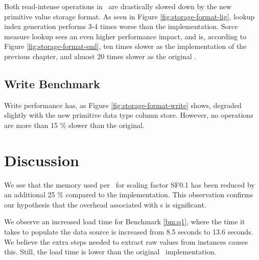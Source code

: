 
Both read-intense operations in \tpchdl~are drastically slowed down by the new primitive value storage format. As seen in Figure \ref{fig:storage-format-lig}, lookup index generation performs 3-4 times worse than the  implementation. Sorce measure lookup sees an even higher performance impact, and is, according to Figure \ref{fig:storage-format-sml}, ten times slower as the implementation of the previous chapter, and almost 20 times slower as the original \gap.

\subsection{Write Benchmark}
\label{sub:Write Benchmark}
Write performance has, as Figure \ref{fig:storage-format-write} shows, degraded slightly with the new primitive data type column store. However, no operations are more than 15 \% slower than the original.

\section{Discussion}
\label{sec:part2-discussion}

We see that the memory used per \lineitem~for scaling factor SF0.1 has been reduced by an additional 25 \% compared to the  implementation. This observation confirms our hypothesis that the overhead associated with s is significant.

We observe an increased load time for Benchmark \ref{bm:q1}, where the time it takes to populate the data source is increased from 8.5 seconds to 13.6 seconds. We believe the extra steps needed to extract raw values from  instances causes this. Still, the load time is lower than the original \gap~implementation.

